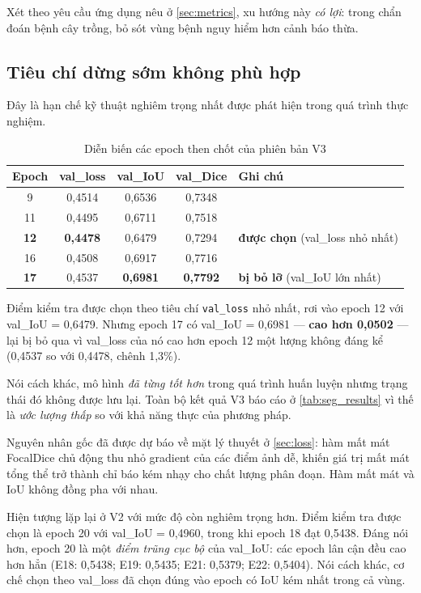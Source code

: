 Xét theo yêu cầu ứng dụng nêu ở \cref{sec:metrics}, xu hướng này \emph{có lợi}:
trong chẩn đoán bệnh cây trồng, bỏ sót vùng bệnh nguy hiểm hơn cảnh báo thừa.

\subsection{Tiêu chí dừng sớm không phù hợp}
\label{subsec:earlystop}

Đây là hạn chế kỹ thuật nghiêm trọng nhất được phát hiện trong quá trình thực
nghiệm.

\begin{table}[H]
\centering
\caption{Diễn biến các epoch then chốt của phiên bản V3}
\label{tab:v3_epochs}
\begin{tabular}{c c c c l}
\toprule
\textbf{Epoch} & \textbf{val\_loss} & \textbf{val\_IoU} & \textbf{val\_Dice} & \textbf{Ghi chú} \\
\midrule
9  & 0,4514 & 0,6536 & 0,7348 & \\
11 & 0,4495 & 0,6711 & 0,7518 & \\
\textbf{12} & \textbf{0,4478} & 0,6479 & 0,7294 & \textbf{được chọn} (val\_loss nhỏ nhất) \\
16 & 0,4508 & 0,6917 & 0,7716 & \\
\textbf{17} & 0,4537 & \textbf{0,6981} & \textbf{0,7792} & \textbf{bị bỏ lỡ} (val\_IoU lớn nhất) \\
\bottomrule
\end{tabular}
\end{table}

Điểm kiểm tra được chọn theo tiêu chí \texttt{val\_loss} nhỏ nhất, rơi vào epoch
12 với val\_IoU = 0,6479. Nhưng epoch 17 có val\_IoU = 0,6981 --- \textbf{cao hơn
0,0502} --- lại bị bỏ qua vì val\_loss của nó cao hơn epoch 12 một lượng không
đáng kể (0,4537 so với 0,4478, chênh 1,3\%).

Nói cách khác, mô hình \emph{đã từng tốt hơn} trong quá trình huấn luyện nhưng
trạng thái đó không được lưu lại. Toàn bộ kết quả V3 báo cáo ở
\cref{tab:seg_results} vì thế là \emph{ước lượng thấp} so với khả năng thực của
phương pháp.

Nguyên nhân gốc đã được dự báo về mặt lý thuyết ở \cref{sec:loss}: hàm mất mát
FocalDice chủ động thu nhỏ gradient của các điểm ảnh dễ, khiến giá trị mất mát
tổng thể trở thành chỉ báo kém nhạy cho chất lượng phân đoạn. Hàm mất mát và IoU
không đồng pha với nhau.

Hiện tượng lặp lại ở V2 với mức độ còn nghiêm trọng hơn. Điểm kiểm tra được chọn
là epoch 20 với val\_IoU = 0,4960, trong khi epoch 18 đạt 0,5438. Đáng nói hơn,
epoch 20 là một \emph{điểm trũng cục bộ} của val\_IoU: các epoch lân cận đều cao
hơn hẳn (E18: 0,5438; E19: 0,5435; E21: 0,5379; E22: 0,5404). Nói cách khác, cơ
chế chọn theo val\_loss đã chọn đúng vào epoch có IoU kém nhất trong cả vùng.

